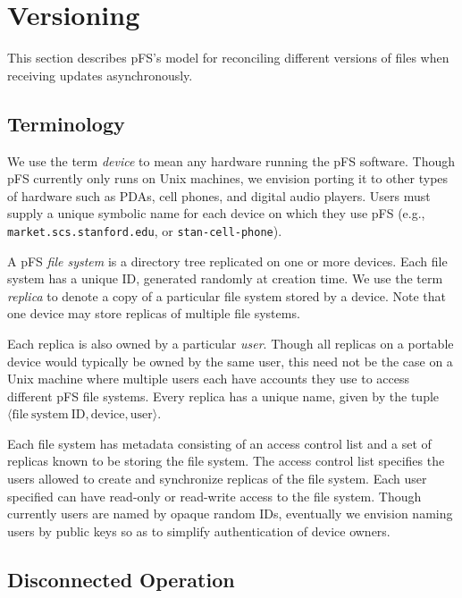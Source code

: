 
\section{Versioning}
\label{sec:vers}

This section describes pFS's model for reconciling different versions
of files when receiving updates asynchronously.

\subsection{Terminology}

We use the term \emph{device} to mean any hardware running the pFS
software.  Though pFS currently only runs on Unix machines, we
envision porting it to other types of hardware such as PDAs, cell
phones, and digital audio players.  Users must supply a unique
symbolic name for each device on which they use pFS (e.g.,
\texttt{market.scs.stanford.edu}, or \texttt{stan-cell-phone}).

A pFS \emph{file system} is a directory tree replicated on one or more
devices.  Each file system has a unique ID, generated randomly at
creation time.  We use the term \emph{replica} to denote a copy of a
particular file system stored by a device.  Note that one device may
store replicas of multiple file systems.

Each replica is also owned by a particular \emph{user}.  Though all
replicas on a portable device would typically be owned by the same
user, this need not be the case on a Unix machine where multiple users
each have accounts they use to access different pFS file systems.
Every replica has a unique name, given by the tuple $\langle
\mathrm{file\ system\ ID}, \mathrm{device}, \mathrm{user}\rangle$.

Each file system has metadata consisting of an access control list and
a set of replicas known to be storing the file system.  The access
control list specifies the users allowed to create and synchronize
replicas of the file system.  Each user specified can have read-only
or read-write access to the file system.  Though currently users are
named by opaque random IDs, eventually we envision naming users by
public keys so as to simplify authentication of device owners.

\subsection{Disconnected Operation}

